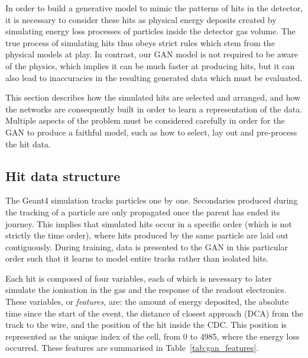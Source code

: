 In order to build a generative model to mimic the patterns of hits in the
detector, it is necessary to consider these hits as physical energy
deposits created by simulating energy loss processes of particles inside the
detector gas volume. The true process of simulating hits thus obeys strict rules
which stem from the physical models at play. In contrast, our GAN model is not
required to be aware of the physics, which implies it can be much faster at
producing hits, but it can also lead to inaccuracies in the resulting generated
data which must be evaluated.

This section describes how the simulated hits are selected and arranged, and how
the networks are consequently built in order to learn a representation of the
data. Multiple aspects of the problem must be considered carefully in order for
the GAN to produce a faithful model, such as how to select, lay out and
pre-process the hit data.


\subsection{Hit data structure}
\label{sec:hit_data_structure}

The {\sc Geant4} simulation tracks particles one by one. Secondaries
produced during the tracking of a particle are only propagated once the parent
has ended its journey. This implies that simulated hits occur in a specific
order (which is not strictly the time order), where hits produced by the same
particle are laid out contiguously. During training, data is presented to the
GAN in this particular order such that it learns to model entire tracks rather
than isolated hits.

Each hit is composed of four variables, each of which is necessary to later
simulate the ionisation in the gas and the response of the readout electronics.
These variables, or \emph{features}, are: the amount of energy deposited, the
absolute time since the start of the event, the distance of closest approach
(DCA) from the track to the wire, and the position of the hit inside the CDC.
This position is represented as the unique index of the cell, from 0 to 4985, where the energy loss occurred. These features are summarised in
Table~\ref{tab:gan_features}.

